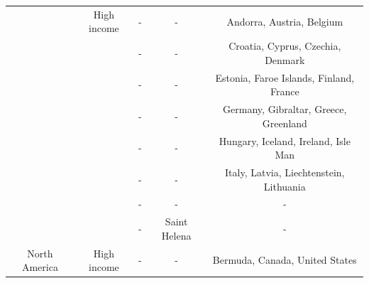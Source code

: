 \begin{appendix}
\begin{table}
{\begin{tabular}[t]{ccccc}
 & High income & - & - & Andorra, Austria, Belgium\\
 &  & - & - & Croatia, Cyprus, Czechia, Denmark\\
 &  & - & - & Estonia, Faroe Islands, Finland, France\\
 &  & - & - & Germany, Gibraltar, Greece, Greenland\\
 &  & - & - & Hungary, Iceland, Ireland, Isle  Man\\
 &  & - & - & Italy, Latvia, Liechtenstein, Lithuania\\
 &  & - & - & -\\
 &  & - & Saint Helena & -\\
\cline{1-5}
North America & High income & - & - & Bermuda, Canada, United States\\
\bottomrule
\end{tabular}}
\end{table}
\elandscape
\end{appendix}
